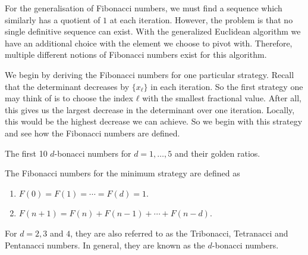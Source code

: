 For the generalisation of Fibonacci numbers,
we must find a sequence which similarly has a quotient of $1$ at each iteration.
However, the problem is that no single definitive sequence can exist.
With the generalized Euclidean algorithm we have an additional choice with the
element we choose to pivot with.
Therefore, multiple different notions of Fibonacci numbers exist for this
algorithm.

We begin by deriving the Fibonacci numbers for one particular strategy.
Recall that the determinant decreases by $\{x_ℓ\}$ in each iteration.
So the first strategy one may think of is to choose the index $ℓ$ with the
smallest fractional value.
After all, this gives us the largest decrease in the determinant over one iteration.
Locally, this would be the highest decrease we can achieve.
So we begin with this strategy and see how the Fibonacci numbers are defined.


\begin{table}[tbp]
  \caption{The first 10 $d$-bonacci numbers for $d = 1, …, 5$ and their golden ratios.}
  \label{tbl:min-fibonacci}
  \centering
  
\end{table}

\begin{definition}
  The Fibonacci numbers for the minimum strategy are defined as
  \begin{enumerate}
    \item $F(0) = F(1) = ⋯ = F(d) = 1$.
    \item $F(n + 1) = F(n) + F(n - 1) + ⋯ + F(n - d)$.
  \end{enumerate}
  For $d = 2, 3$ and $4$, they are also referred to as the Tribonacci, Tetranacci
  and Pentanacci numbers.
  In general, they are known as the $d$-bonacci numbers.
\end{definition}

